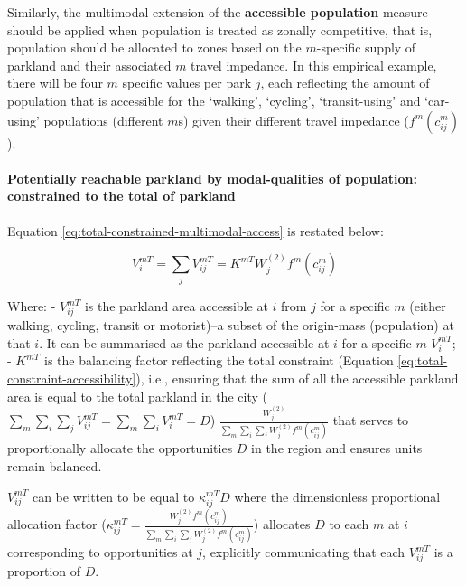 \documentclass[
11pt, %
oneside, %
english, %
singlespacing, %
]{macthesis} %
\begin{document}
Similarly, the multimodal extension of the \textbf{accessible population} measure should be applied when population is treated as zonally competitive, that is, population should be allocated to zones based on the \(m\)-specific supply of parkland and their associated \(m\) travel impedance. In this empirical example, there will be four \(m\) specific values per park \(j\), each reflecting the amount of population that is accessible for the `walking', `cycling', `transit-using' and `car-using' populations (different \(m\)s) given their different travel impedance (\(f^m(c^m_{ij})\)).

\paragraph{Potentially reachable parkland by modal-qualities of population: constrained to the total of parkland}\label{potentially-reachable-parkland-by-modal-qualities-of-population-constrained-to-the-total-of-parkland}

Equation \ref{eq:total-constrained-multimodal-access} is restated below:

\begin{equation}
\label{eq:total-constrained-multimodal-access}
V^{mT}_{i} = \sum_j V^{mT}_{ij} = K^{mT} W_j^{(2)} f^m(c^m_{ij})
\end{equation} 

Where:
- \(V^{mT}_{ij}\) is the parkland area accessible at \(i\) from \(j\) for a specific \(m\) (either walking, cycling, transit or motorist)--a subset of the origin-mass (population) at that \(i\). It can be summarised as the parkland accessible at \(i\) for a specific \(m\) \(V^{mT}_{i}\);
- \(K^{mT}\) is the balancing factor reflecting the total constraint (Equation \ref{eq:total-constraint-accessibility}), i.e., ensuring that the sum of all the accessible parkland area is equal to the total parkland in the city (\(\sum_m\sum_i\sum_j V^{mT}_{ij} = \sum_m \sum_i V^{mT}_{i} = D\)) \(\frac{W^{(2)}_j}{\sum_m\sum_i\sum_j W^{(2)}_jf^m(c^m_{ij})}\) that serves to proportionally allocate the opportunities \(D\) in the region and ensures units remain balanced.

\(V_{ij}^{mT}\) can be written to be equal to \(\kappa_{ij}^{mT} D\) where the dimensionless proportional allocation factor (\(\kappa_{ij}^{mT} = \frac{W_j^{(2)} f^m(c^m_{ij})}{\sum_m\sum_i\sum_j W^{(2)}_jf^m(c^m_{ij})}\)) allocates \(D\) to each \(m\) at \(i\) corresponding to opportunities at \(j\), explicitly communicating that each \(V_{ij}^{mT}\) is a proportion of \(D\).
\end{document}
